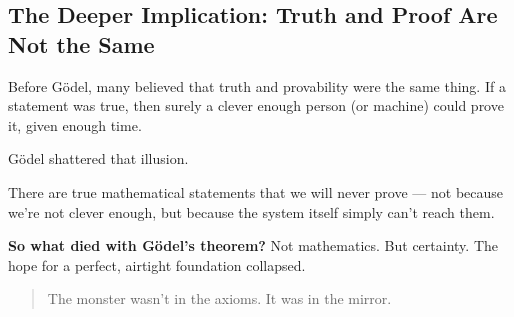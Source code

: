 \subsection{The Deeper Implication: Truth and Proof Are Not the Same}

Before Gödel, many believed that truth and provability were the same thing. If a statement was true, then surely a clever enough person (or machine) could prove it, given enough time.

Gödel shattered that illusion.

There are true mathematical statements that we will never prove — not because we’re not clever enough, but because the system itself simply can’t reach them.

\textbf{So what died with Gödel’s theorem?} Not mathematics. But certainty. The hope for a perfect, airtight foundation collapsed.

\begin{quote}
The monster wasn’t in the axioms. It was in the mirror.
\end{quote}


